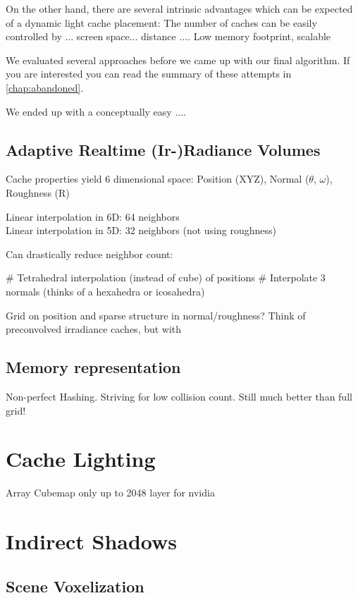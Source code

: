 \documentclass[thesis.tex]{subfiles}
\begin{document}
On the other hand, there are several intrinsic advantages which can be expected of a dynamic light cache placement:
The number of caches can be easily controlled by  ... screen space... distance ....
Low memory footprint, scalable

We evaluated several approaches before we came up with our final algorithm.
If you are interested you can read the summary of these attempts in \autoref{chap:abandoned}.

We ended up with a conceptually easy ....


\subsection{Adaptive Realtime (Ir-)Radiance Volumes}
Cache properties yield 6 dimensional space: Position (XYZ), Normal ($\theta$, $\omega$), Roughness (R)

Linear interpolation in 6D: 64 neighbors\\
Linear interpolation in 5D: 32 neighbors (not using roughness)

Can drastically reduce neighbor count:
\begin{easylist}
# Tetrahedral interpolation (instead of cube) of positions
# Interpolate 3 normals (thinks of a hexahedra or icosahedra)
\end{easylist}

Grid on position and sparse structure in normal/roughness? Think of preconvolved irradiance caches, but with 

\subsection{Memory representation}
Non-perfect Hashing. Striving for low collision count.
Still much better than full grid!

\section{Cache Lighting}
Array Cubemap only up to 2048 layer for nvidia

\section{Indirect Shadows}

\subsection{Scene Voxelization}
\end{document}
